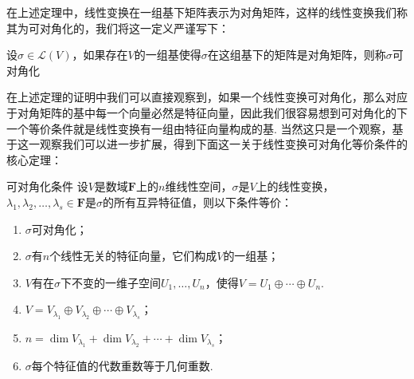 在上述定理中，线性变换在一组基下矩阵表示为对角矩阵，这样的线性变换我们称其为可对角化的，我们将这一定义严谨写下：
\begin{definition}{}{}
    设$\sigma\in\mathcal{L}(V)$，如果存在$V$的一组基使得$\sigma$在这组基下的矩阵是对角矩阵，则称$\sigma$可对角化
\end{definition}

在上述定理的证明中我们可以直接观察到，如果一个线性变换可对角化，那么对应于对角矩阵的基中每一个向量必然是特征向量，因此我们很容易想到可对角化的下一个等价条件就是线性变换有一组由特征向量构成的基. 当然这只是一个观察，基于这一观察我们可以进一步扩展，得到下面这一关于线性变换可对角化等价条件的核心定理：
\begin{theorem}{}{可对角化条件}
    设$V$是数域$\mathbf{F}$上的$n$维线性空间，$\sigma$是$V$上的线性变换，$\lambda_1,\lambda_2,\ldots,\lambda_s\in\mathbf{F}$是$\sigma$的所有互异特征值，则以下条件等价：
    \begin{enumerate}
        \item \label{item:16:可对角化条件:1}
              $\sigma$可对角化；

        \item \label{item:16:可对角化条件:2}
              $\sigma$有$n$个线性无关的特征向量，它们构成$V$的一组基；

        \item \label{item:16:可对角化条件:3}
              $V$有在$\sigma$下不变的一维子空间$U_1,\ldots,U_n$，使得$V=U_1\oplus\cdots\oplus U_n$.

        \item \label{item:16:可对角化条件:4}
              $V=V_{\lambda_1}\oplus V_{\lambda_2}\oplus\cdots\oplus V_{\lambda_s}$；

        \item \label{item:16:可对角化条件:5}
              $n=\dim V_{\lambda_1}+\dim V_{\lambda_2}+\cdots+\dim V_{\lambda_s}$；

        \item \label{item:16:可对角化条件:6}
              $\sigma$每个特征值的代数重数等于几何重数.
    \end{enumerate}
\end{theorem}

